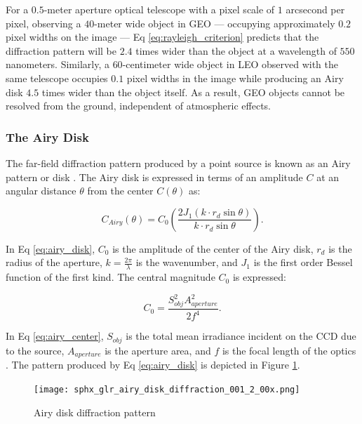 For a $0.5$-meter aperture optical telescope with a pixel scale of $1$ arcsecond per pixel, observing a $40$-meter wide object in GEO --- occupying approximately $0.2$ pixel widths on the image --- Eq \ref{eq:rayleigh_criterion} predicts that the diffraction pattern will be $2.4$ times wider than the object at a wavelength of $550$ nanometers. Similarly, a $60$-centimeter wide object in LEO observed with the same telescope occupies $0.1$ pixel widths in the image while producing an Airy disk $4.5$ times wider than the object itself. As a result, GEO objects cannot be resolved from the ground, independent of atmospheric effects. 

\subsubsection{The Airy Disk}

The far-field diffraction pattern produced by a point source is known as an Airy pattern or disk \cite{frueh2019notes}. The Airy disk is expressed in terms of an amplitude $C$ at an angular distance $\theta$ from the center $C(\theta)$ \cite{frueh2019notes} as:

\begin{equation} \label{eq:airy_disk}
  C_{Airy}(\theta) = C_0 \left( \frac{2 J_1(k \cdot r_d \sin\theta)}{k \cdot r_d \sin\theta} \right).
\end{equation}

In Eq \ref{eq:airy_disk}, $C_0$ is the amplitude of the center of the Airy disk, $r_d$ is the radius of the aperture, $k = \frac{2\pi}{\lambda}$ is the wavenumber, and $J_1$ is the first order Bessel function of the first kind. The central magnitude $C_0$ is expressed:

\begin{equation} \label{eq:airy_center}
  C_0 = \frac{S_{obj}^2 A_{aperture}^2}{2 f^4}.
\end{equation}

In Eq \ref{eq:airy_center}, $S_{obj}$ is the total mean irradiance incident on the CCD due to the source, $A_{aperture}$ is the aperture area, and $f$ is the focal length of the optics \cite{frueh2019notes}. The pattern produced by Eq \ref{eq:airy_disk} is depicted in Figure \ref{fig:airy_disk_magnitude}.

\begin{figure}[ht]
  \centering
  \texttt{[image: sphx\_glr\_airy\_disk\_diffraction\_001\_2\_00x.png]}
  \caption{Airy disk diffraction pattern}
  \label{fig:airy_disk_magnitude}
\end{figure}

